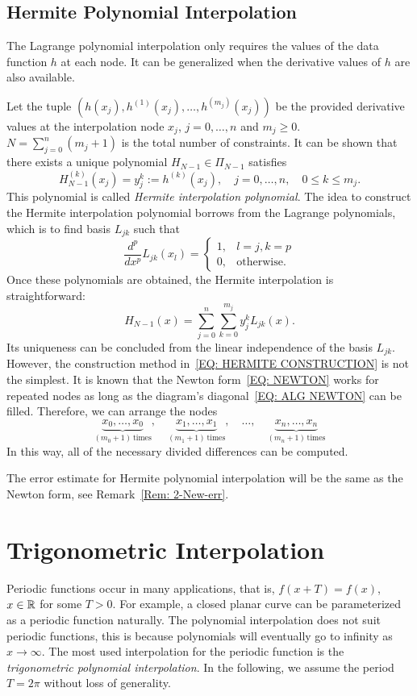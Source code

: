 \subsection{Hermite Polynomial Interpolation}
\label{SSec: 2-Her-Pol-Int}
The Lagrange polynomial interpolation only requires the values of the data function $h$ at each node. It can be generalized when the derivative values of $h$ are also available. 

Let the tuple $(h(x_j), h^{(1)}(x_j), \dots, h^{(m_j)}(x_j))$ be the provided derivative values at the interpolation node $x_j$, $j=0,\dots, n$ and $m_j\ge 0$. $N = \sum_{j=0}^n (m_j + 1)$ is the total number of constraints. It can be shown that there exists a unique polynomial $H_{N-1}\in \Pi_{N-1}$ satisfies 
$$H_{N-1}^{(k)}(x_j) = y_j^k:= h^{(k)}(x_j),\quad j=0,\dots, n,\quad 0\le k\le m_j.$$
This polynomial is called \emph{Hermite interpolation polynomial}. The idea to construct the Hermite interpolation polynomial borrows from the Lagrange polynomials, which is to find basis $L_{jk}$ such that 
\begin{equation}\label{EQ: HERMITE CONSTRUCTION}
    \frac{d^p}{d x^p}L_{jk}(x_l) = \begin{cases}
        1, & l = j, k = p\\
        0, & \text{otherwise}.
    \end{cases}
\end{equation}
Once these polynomials are obtained, the Hermite interpolation is straightforward:
$$H_{N-1}(x) = \sum_{j=0}^n \sum_{k=0}^{m_j} y_j^k L_{jk}(x).$$
Its uniqueness can be concluded from the linear independence of the basis $L_{jk}$. However, the construction method in~\eqref{EQ: HERMITE CONSTRUCTION} is not the simplest. It is known that the Newton form~\eqref{EQ: NEWTON} works for repeated nodes as long as the diagram's diagonal~\eqref{EQ: ALG NEWTON} can be filled. Therefore, we can arrange the nodes 
$$\underbrace{x_0,\dots, x_0}_{(m_0+1)\,\text{times}}, \quad \underbrace{x_1,\dots, x_1}_{(m_1+1)\,\text{times}}, \quad \dots,\quad  \underbrace{x_n,\dots, x_n}_{(m_n+1)\,\text{times}}$$
In this way, all of the necessary divided differences can be computed.
\begin{remark}
    The error estimate for Hermite polynomial interpolation will be the same as the Newton form, see Remark~\ref{Rem: 2-New-err}.
\end{remark}


\section{Trigonometric Interpolation}
\label{Sec: 2-Tri-Int}
Periodic functions occur in many applications, that is, $f(x + T) = f(x)$, $x\in \mathbb R$ for some $T > 0$. For example, a closed planar curve can be parameterized as a periodic function naturally. The polynomial interpolation does not suit periodic functions, this is because polynomials will eventually go to infinity as $x\to\infty$. The most used interpolation for the periodic function is the \emph{trigonometric polynomial interpolation}. In the following, we assume the period $T = 2\pi$ without loss of generality.



